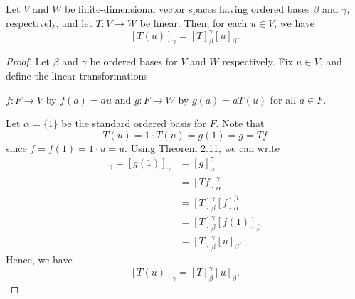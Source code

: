 \begin{theorem}
    Let \( V  \) and \( W  \) be finite-dimensional vector spaces having ordered bases \( \beta  \) and \( \gamma  \), respectively, and let \( T: V \to W  \) be linear. Then, for each \( u \in V  \), we have
    \[  [T(u)]_{\gamma}^{}  = [T]_{\beta}^{\gamma}  [u]_{\beta}^{}. \]
\end{theorem}
\begin{proof}
    Let \( \beta \) and \( \gamma \) be ordered bases for \( V  \) and \( W  \) respectively. Fix \( u \in V  \), and define the linear transformations 
    \begin{center}
        \( f: F \to V  \) by \( f(a) = au  \) and \( g: F \to W  \) by \( g(a) = aT(u) \) for all \( a \in F  \). 
    \end{center}
    Let \( \alpha = \{  1  \}  \) be the standard ordered basis for \( F  \). Note that 
    \[  T(u) = 1 \cdot T(u) = g(1) = g = Tf  \]
    since \( f = f(1)  = 1 \cdot u = u\). Using Theorem 2.11, we can write
    \begin{align*}
        [T(u)]_{\gamma}  = [g(1)]_{\gamma} &= [g]_{\alpha}^{\gamma}  \\
                                                 &= [Tf]_{\alpha}^{\gamma} \\
                                                 &= [T]_{\beta}^{\gamma} [f]_{\alpha}^{\beta} \\
                                                 &= [T]_{\beta}^{\gamma}  [f(1)]_{\beta}  \\
                                                 &= [T]_{\beta}^{\gamma}  [u]_{\beta}.
    \end{align*}
    Hence, we have
    \[  [T(u)]_{\gamma} = [T]_{\beta}^{\gamma}  [u]_{\beta}. \]
\end{proof}

